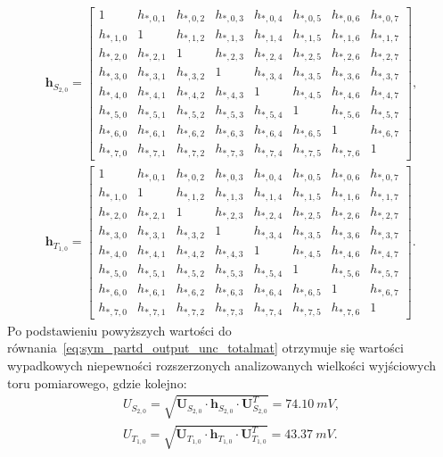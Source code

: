 \begin{gather}
\mathbf{h}_{S_{2,0}} =
\begin{bmatrix}
1 & h_{*,0,1} & h_{*,0,2} & h_{*,0,3} & h_{*,0,4} & h_{*,0,5} & h_{*,0,6} & h_{*,0,7} \\
h_{*,1,0} & 1 & h_{*,1,2} & h_{*,1,3} & h_{*,1,4} & h_{*,1,5} & h_{*,1,6} & h_{*,1,7} \\
h_{*,2,0} & h_{*,2,1} & 1 & h_{*,2,3} & h_{*,2,4} & h_{*,2,5} & h_{*,2,6} & h_{*,2,7} \\
h_{*,3,0} & h_{*,3,1} & h_{*,3,2} & 1 & h_{*,3,4} & h_{*,3,5} & h_{*,3,6} & h_{*,3,7} \\
h_{*,4,0} & h_{*,4,1} & h_{*,4,2} & h_{*,4,3} & 1 & h_{*,4,5} & h_{*,4,6} & h_{*,4,7} \\
h_{*,5,0} & h_{*,5,1} & h_{*,5,2} & h_{*,5,3} & h_{*,5,4} & 1 & h_{*,5,6} & h_{*,5,7} \\
h_{*,6,0} & h_{*,6,1} & h_{*,6,2} & h_{*,6,3} & h_{*,6,4} & h_{*,6,5} & 1 & h_{*,6,7} \\
h_{*,7,0} & h_{*,7,1} & h_{*,7,2} & h_{*,7,3} & h_{*,7,4} & h_{*,7,5} & h_{*,7,6} & 1
\end{bmatrix}
\label{eq:sym_partd_output_unc_cohermat_S_2_0_b}, \\
\mathbf{h}_{T_{1,0}} =
\begin{bmatrix}
1 & h_{*,0,1} & h_{*,0,2} & h_{*,0,3} & h_{*,0,4} & h_{*,0,5} & h_{*,0,6} & h_{*,0,7} \\
h_{*,1,0} & 1 & h_{*,1,2} & h_{*,1,3} & h_{*,1,4} & h_{*,1,5} & h_{*,1,6} & h_{*,1,7} \\
h_{*,2,0} & h_{*,2,1} & 1 & h_{*,2,3} & h_{*,2,4} & h_{*,2,5} & h_{*,2,6} & h_{*,2,7} \\
h_{*,3,0} & h_{*,3,1} & h_{*,3,2} & 1 & h_{*,3,4} & h_{*,3,5} & h_{*,3,6} & h_{*,3,7} \\
h_{*,4,0} & h_{*,4,1} & h_{*,4,2} & h_{*,4,3} & 1 & h_{*,4,5} & h_{*,4,6} & h_{*,4,7} \\
h_{*,5,0} & h_{*,5,1} & h_{*,5,2} & h_{*,5,3} & h_{*,5,4} & 1 & h_{*,5,6} & h_{*,5,7} \\
h_{*,6,0} & h_{*,6,1} & h_{*,6,2} & h_{*,6,3} & h_{*,6,4} & h_{*,6,5} & 1 & h_{*,6,7} \\
h_{*,7,0} & h_{*,7,1} & h_{*,7,2} & h_{*,7,3} & h_{*,7,4} & h_{*,7,5} & h_{*,7,6} & 1
\end{bmatrix}
\label{eq:sym_partd_output_unc_cohermat_T_1_0_b}.
\end{gather}
Po podstawieniu powyższych wartości do równania~\eqref{eq:sym_partd_output_unc_totalmat} otrzymuje się wartości wypadkowych niepewności rozszerzonych analizowanych wielkości wyjściowych toru pomiarowego, gdzie kolejno:
\begin{gather}
U_{S_{2,0}} = \sqrt{\mathbf{U}_{S_{2,0}} \cdot \mathbf{h}_{S_{2,0}} \cdot \mathbf{U}_{S_{2,0}}^{T}} = \qty{74.10}{mV} \label{eq:sym_partd_output_unc_totalmat_S_2_0}, \\
U_{T_{1,0}} = \sqrt{\mathbf{U}_{T_{1,0}} \cdot \mathbf{h}_{T_{1,0}} \cdot \mathbf{U}_{T_{1,0}}^{T}} = \qty{43.37}{mV} \label{eq:sym_partd_output_unc_totalmat_T_1_0}.
\end{gather}

